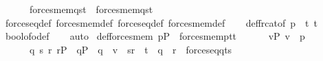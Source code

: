 \begin{isabellebody}
\ \ \ \ \ \ {\isacharparenleft}{\kern0pt}forces{\isacharunderscore}{\kern0pt}mem{\isacharparenleft}{\kern0pt}q{\isacharcomma}{\kern0pt}s{\isacharcomma}{\kern0pt}t{}{\isacharparenright}{\kern0pt}\ {\isasymlongleftrightarrow}\ forces{\isacharunderscore}{\kern0pt}mem{\isacharparenleft}{\kern0pt}q{\isacharcomma}{\kern0pt}s{\isacharcomma}{\kern0pt}t{}{\isacharparenright}{\kern0pt}{\isacharparenright}{\kern0pt}{\isacharparenright}{\kern0pt}{\isachardoublequoteclose}\isanewline
%
\isadelimproof
\ \ %
\endisadelimproof
%
\isatagproof
{}\isamarkupfalse%
\ forces{\isacharunderscore}{\kern0pt}eq{\isacharunderscore}{\kern0pt}def\ forces{\isacharunderscore}{\kern0pt}mem{\isacharunderscore}{\kern0pt}def\ forces{\isacharunderscore}{\kern0pt}eq{\isacharprime}{\kern0pt}{\isacharunderscore}{\kern0pt}def\ forces{\isacharunderscore}{\kern0pt}mem{\isacharprime}{\kern0pt}{\isacharunderscore}{\kern0pt}def\isanewline
\ \ \isamarkupfalse%
\ def{\isacharunderscore}{\kern0pt}frc{\isacharunderscore}{\kern0pt}at{\isacharbrackleft}{\kern0pt}of\ p\ {}\ t{}\ t{}\ {\isacharbrackright}{\kern0pt}\ \ \isamarkupfalse%
\ bool{\isacharunderscore}{\kern0pt}of{\isacharunderscore}{\kern0pt}o{\isacharunderscore}{\kern0pt}def\isanewline
\ \ \isamarkupfalse%
\ auto%
\endisatagproof
{\isafoldproof}%
%
\isadelimproof
\isanewline
%
\endisadelimproof
\isanewline
{}\isamarkupfalse%
\ def{\isacharunderscore}{\kern0pt}forces{\isacharunderscore}{\kern0pt}mem{\isacharcolon}{\kern0pt}\ {\isachardoublequoteopen}p{\isasymin}P\ {\isasymLongrightarrow}\ forces{\isacharunderscore}{\kern0pt}mem{\isacharparenleft}{\kern0pt}p{\isacharcomma}{\kern0pt}t{}{\isacharcomma}{\kern0pt}t{}{\isacharparenright}{\kern0pt}\ {\isasymlongleftrightarrow}\isanewline
\ \ \ \ \ {\isacharparenleft}{\kern0pt}{\isasymforall}v{\isasymin}P{\isachardot}{\kern0pt}\ v\ {\isasympreceq}\ p\ {\isasymlongrightarrow}\isanewline
\ \ \ \ \ \ {\isacharparenleft}{\kern0pt}{\isasymexists}q{\isachardot}{\kern0pt}\ {\isasymexists}s{\isachardot}{\kern0pt}\ {\isasymexists}r{\isachardot}{\kern0pt}\ r{\isasymin}P\ {\isasymand}\ q{\isasymin}P\ {\isasymand}\ q\ {\isasympreceq}\ v\ {\isasymand}\ {\isasymlangle}s{\isacharcomma}{\kern0pt}r{\isasymrangle}\ {\isasymin}\ t{}\ {\isasymand}\ q\ {\isasympreceq}\ r\ {\isasymand}\ forces{\isacharunderscore}{\kern0pt}eq{\isacharparenleft}{\kern0pt}q{\isacharcomma}{\kern0pt}t{}{\isacharcomma}{\kern0pt}s{\isacharparenright}{\kern0pt}{\isacharparenright}{\kern0pt}{\isacharparenright}{\kern0pt}{\isachardoublequoteclose}\isanewline

\end{isabellebody}
